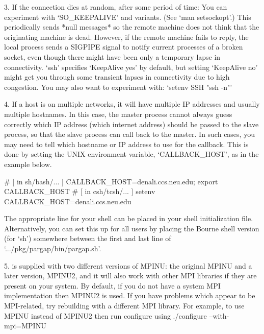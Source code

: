 \item{3.}
    If the connection dies at random, after some period of time:
    You can experiment with `SO_KEEPALIVE' and variants.  
    (See `man setsockopt'.)
    This periodically sends *null messages* so the  remote  machine  does
    not think that the originating  machine  is  dead.  However,  if  the
    remote machine fails to reply, the  local  process  sends  a  SIGPIPE
    signal to notify current processes of a broken  socket,  even  though
    there might have been only a temporary lapse in connectivity.
    `ssh' specifies `KeepAlive yes' by default, but setting `KeepAlive no'
    might get you through some transient lapses in  connectivity  due  to
    high congestion. 
    You may also want to experiment with: `setenv SSH "ssh -n"'

\item{4.}
    If a host is on multiple networks, it will have multiple IP addresses and
    usually multiple hostnames. In  this  case,  the  master  process  cannot
    always guess correctly which IP address (which internet  address)  should
    be passed to the slave process, so that the slave process can  call  back
    to the master. In such cases,  you  may  need  to  tell  {\ParGAP}  which
    hostname or IP address to use for the callback. This is done  by  setting
    the UNIX environment variable, `CALLBACK_HOST', as in the example below.

\begintt
# [ in sh/bash/... ]
CALLBACK_HOST=denali.ccs.neu.edu; export CALLBACK_HOST
# [ in csh/tcsh/... ]
setenv CALLBACK_HOST=denali.ccs.neu.edu
\endtt

\item{}
    The appropriate  line  for  your  shell  can  be  placed  in  your  shell
    initialization file. Alternatively, you can set this up for all users  by
    placing the Bourne shell version (for `sh') somewhere between  the  first
    and last line of `.../pkg/pargap/bin/pargap.sh'.

\item{5.}
    {\ParGAP} is supplied with two different versions of MPINU: the original
    MPINU and a later version, MPINU2, and it will also work with other MPI
    libraries if they are present on your system. By default, if you do
    not have a system MPI implementation then MPINU2 is used. If you have 
    problems which appear to be MPI-related, try rebuilding {\ParGAP} with a 
    different MPI library. For example, to use MPINU instead of MPINU2 then
    run configure using
\begintt
./configure --with-mpi=MPINU
\endtt

